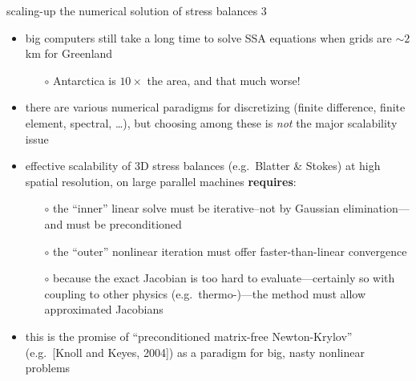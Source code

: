 \begin{frame}{scaling-up the numerical solution of stress balances 3}

\begin{itemize}
\item big computers still take a long time to solve SSA equations when grids are $\sim 2$ km for Greenland
  \begin{itemize}
  \item[$\circ$] Antarctica is $10\times$ the area, and that much worse!
  \end{itemize}
\item there are various numerical paradigms for discretizing (finite difference, finite element, spectral, \dots), but choosing among these is \emph{not} the major scalability issue
\item effective scalability of 3D stress balances (e.g.~Blatter \& Stokes) at high spatial resolution, on large parallel machines \textbf{requires}:
  \begin{itemize}
  \item[$\circ$] the ``inner'' linear solve must be iterative--not by Gaussian elimination---and must be preconditioned
  \item[$\circ$] the ``outer'' nonlinear iteration must offer faster-than-linear convergence
  \item[$\circ$] because the exact Jacobian is too hard to evaluate---certainly so with coupling to other physics (e.g.~thermo-)---the method must allow approximated Jacobians
  \end{itemize}
\item this is the promise of ``preconditioned matrix-free Newton-Krylov'' (e.g.~[Knoll and Keyes, 2004]\nocite{KnollKeyes2004}) as a paradigm for big, nasty nonlinear problems
\end{itemize}
\end{frame}


